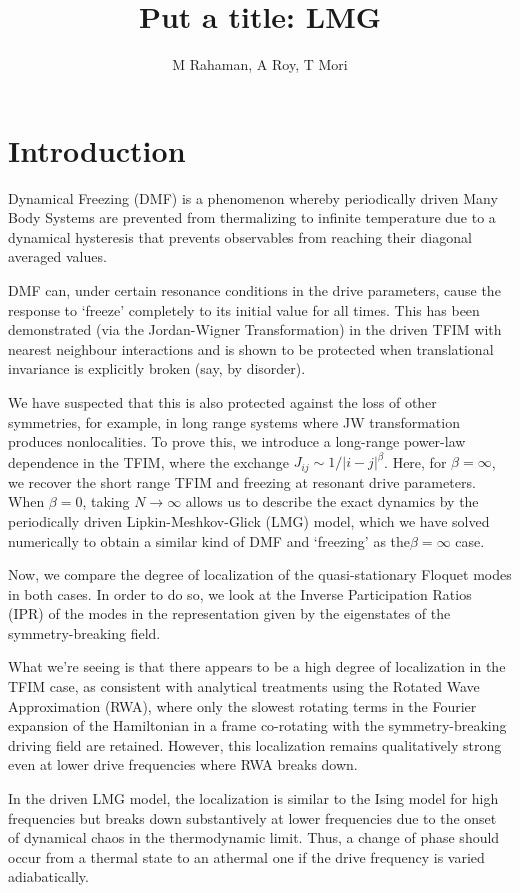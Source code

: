 \documentclass{article}
\title{Put a title: LMG}
\author{M Rahaman, A Roy, T Mori}
\begin{document}
\maketitle

\section{Introduction}
Dynamical Freezing (DMF) is a phenomenon whereby periodically driven Many Body Systems are prevented from thermalizing to infinite temperature due to a dynamical hysteresis that prevents observables from reaching their diagonal averaged values.

DMF can, under certain resonance conditions in the drive parameters, cause the response to ‘freeze’ completely to its initial value for all times\cite{ArnabD}. This has been demonstrated (via the Jordan-Wigner Transformation) in the driven TFIM with nearest neighbour interactions and is shown to be protected when translational invariance is explicitly broken (say, by disorder). 

We have suspected that this is also protected against the loss of other symmetries, for example, in long range systems where JW transformation produces nonlocalities. To prove this, we introduce a long-range power-law dependence in the TFIM, where the exchange $J_{ij}\sim 1/|i-j|^\beta$. Here, for $\beta=\infty$, we recover the short range TFIM and freezing at resonant drive parameters. When $\beta=0$, taking $N\rightarrow\infty$ allows us to describe the exact dynamics by the periodically driven Lipkin-Meshkov-Glick (LMG) model, which we have solved numerically to obtain a similar kind of DMF and ‘freezing’ as the$\beta=\infty$ case.

Now, we compare the degree of localization of the quasi-stationary Floquet modes in both cases. In order to do so, we look at the Inverse Participation Ratios (IPR) of the modes in the representation given by the eigenstates of the symmetry-breaking field. 

What we're seeing is that there appears to be a high degree of localization in the TFIM case, as consistent with analytical treatments using the Rotated Wave Approximation (RWA), where only the slowest rotating terms in the Fourier expansion of the Hamiltonian in a frame co-rotating with the symmetry-breaking driving field are retained. However, this localization remains qualitatively strong even at lower drive frequencies where RWA breaks down.

In the driven LMG model, the localization is similar to the Ising model for high frequencies but breaks down substantively at lower frequencies due to the onset of dynamical chaos in the thermodynamic limit. Thus, a change of phase should occur from a thermal state to an athermal one if the drive frequency is varied adiabatically.
\end{document}
